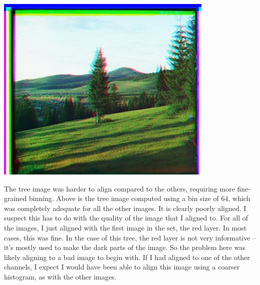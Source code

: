\documentclass[12pt]{article}
\begin{document}
\begin{center}
\includegraphics[scale=0.6]{processed/processed-64-00600v.jpg}
\end{center}

The tree image was harder to align compared to the others, requiring more fine-grained binning. Above is the tree image computed using a bin size of 64, which was completely adequate for all the other images. It is clearly poorly aligned. I suspect this has to do with the quality of the image that I aligned to. For all of the images, I just aligned with the first image in the set, the red layer. In most cases, this was fine. In the case of this tree, the red layer is not very informative -- it's mostly used to make the dark parts of the image. So the problem here was likely aligning to a bad image to begin with. If I had aligned to one of the other channels, I expect I would have been able to align this image using a coarser histogram, as with the other images.
\end{document}
